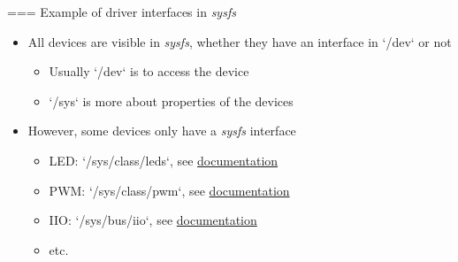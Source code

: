 === {Example of driver interfaces in {\em sysfs}}
  \begin{itemize}
  \item All devices are visible in {\em sysfs}, whether they have an
    interface in `/dev` or not
    \begin{itemize}
    \item Usually `/dev` is to access the device
    \item `/sys` is more about properties of the devices
    \end{itemize}
  \item However, some devices only have a {\em sysfs} interface
    \begin{itemize}
    \item LED: `/sys/class/leds`, see \href{https://docs.kernel.org/leds/leds-class.html}{documentation}
    \item PWM: `/sys/class/pwm`, see \href{https://docs.kernel.org/driver-api/pwm.html\#using-pwms-with-the-sysfs-interface}{documentation}
    \item IIO: `/sys/bus/iio`, see \href{https://docs.kernel.org/driver-api/iio/index.html}{documentation}
    \item etc.
    \end{itemize}
  \end{itemize}



